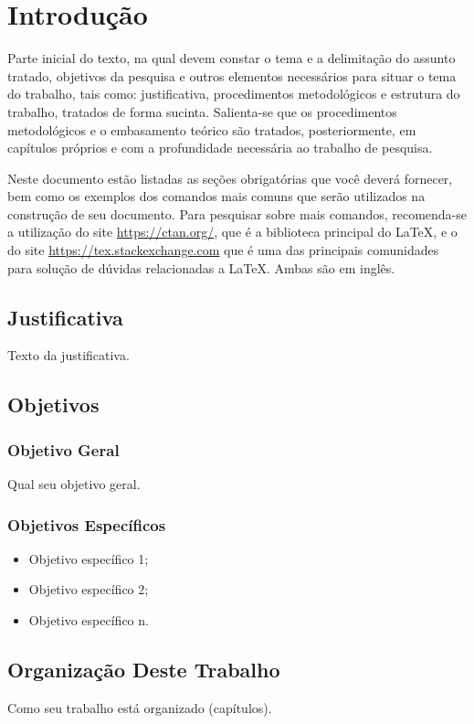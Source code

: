 \chapter{Introdução}
\label{cap:01}

Parte inicial do texto, na qual devem constar o tema e a delimitação do assunto tratado, objetivos da pesquisa e outros elementos necessários para situar o tema do trabalho, tais como: justificativa, procedimentos metodológicos e estrutura do trabalho, tratados de forma sucinta. Salienta-se que os procedimentos metodológicos e o embasamento teórico são tratados, posteriormente, em capítulos próprios e com a profundidade necessária ao trabalho de pesquisa.

Neste documento estão listadas as seções obrigatórias que você deverá fornecer, bem como os exemplos dos comandos mais comuns que serão utilizados na construção de seu documento. Para pesquisar sobre mais comandos, recomenda-se a utilização do site \url{https://ctan.org/}, que é a biblioteca principal do \LaTeX, e o do site \url{https://tex.stackexchange.com} que é uma das principais comunidades para solução de dúvidas relacionadas a \LaTeX. Ambas são em inglês.

\section{Justificativa}

Texto da justificativa.

\section{Objetivos}

\subsection{Objetivo Geral}

Qual seu objetivo geral.

\subsection{Objetivos Específicos}
\begin{itemize}
	\item Objetivo específico 1;
	\item Objetivo específico 2;
	\item Objetivo específico n.
\end{itemize}



\section{Organização Deste Trabalho}

Como seu trabalho está organizado (capítulos).